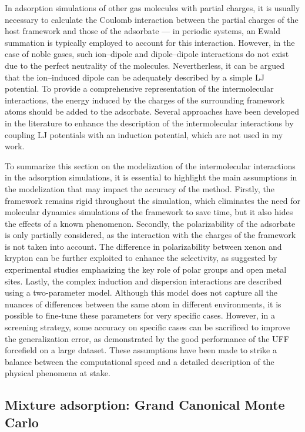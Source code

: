\documentclass[main.tex]{subfiles}
\begin{document}
In adsorption simulations of other gas molecules with partial charges, it is usually necessary to calculate the Coulomb interaction between the partial charges of the host framework and those of the adsorbate --- in periodic systems, an Ewald summation is typically employed to account for this interaction. However, in the case of noble gases, such ion--dipole and dipole--dipole interactions do not exist due to the perfect neutrality of the molecules. Nevertherless, it can be argued that the ion--induced dipole can be adequately described by a simple LJ potential. To provide a comprehensive representation of the intermolecular interactions, the energy induced by the charges of the surrounding framework atoms should be added to the adsorbate. Several approaches have been developed in the literature to enhance the description of the intermolecular interactions by coupling LJ potentials with an induction potential,\autocite{Lachet_1998,Becker_2017} which are not used in my work.

To summarize this section on the modelization of the intermolecular interactions in the adsorption simulations, it is essential to highlight the main assumptions in the modelization that may impact the accuracy of the method. Firstly, the framework remains rigid throughout the simulation, which eliminates the need for molecular dynamics simulations of the framework to save time, but it also hides the effects of a known phenomenon.\autocite{Witman_2017} Secondly, the polarizability of the adsorbate is only partially considered, as the interaction with the charges of the framework is not taken into account. The difference in polarizability between xenon and krypton can be further exploited to enhance the selectivity, as suggested by experimental studies emphasizing the key role of polar groups and open metal sites.\autocite{Li_2019,Pei_2022,Perry_2014} Lastly, the complex induction and dispersion interactions are described using a two-parameter model. Although this model does not capture all the nuances of differences between the same atom in different environments, it is possible to fine-tune these parameters for very specific cases. However, in a screening strategy, some accuracy on specific cases can be sacrificed to improve the generalization error, as demonstrated by the good performance of the UFF forcefield on a large dataset.\autocite{McDaniel_2015}
These assumptions have been made to strike a balance between the computational speed and a detailed description of the physical phenomena at stake.


\subsection{Mixture adsorption: Grand Canonical Monte Carlo}\label{sct:GCMC}
\end{document}
